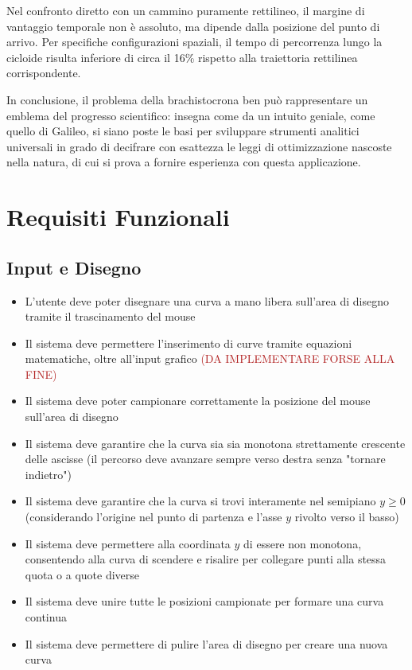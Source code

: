 \documentclass[a4paper,12pt]{article} %
\begin{document}
Nel confronto diretto con un cammino puramente rettilineo, il margine di vantaggio temporale non è assoluto, ma dipende dalla posizione del punto di arrivo. Per specifiche configurazioni spaziali, il tempo di percorrenza lungo la cicloide risulta inferiore di circa il 16\% rispetto alla traiettoria rettilinea corrispondente.
\vspace{1em}

In conclusione, il problema della brachistocrona ben può rappresentare un emblema del progresso scientifico: insegna come da un intuito geniale, come quello di Galileo, si siano poste le basi per sviluppare strumenti analitici universali in grado di decifrare con esattezza le leggi di ottimizzazione nascoste nella natura, di cui si prova a fornire esperienza con questa applicazione.

\section{Requisiti Funzionali}

\subsection{Input e Disegno}

\begin{itemize}
    \item L'utente deve poter disegnare una curva a mano libera sull'area di disegno tramite il trascinamento del mouse
    \item Il sistema deve permettere l'inserimento di curve tramite equazioni matematiche, oltre all'input grafico \textcolor{firebrick}{(DA IMPLEMENTARE FORSE ALLA FINE)}
    \item Il sistema deve poter campionare correttamente la posizione del mouse sull'area di disegno
    \item Il sistema deve garantire che la curva sia sia monotona strettamente crescente delle ascisse (il percorso deve avanzare sempre verso destra senza "tornare indietro")
    \item Il sistema deve garantire che la curva si trovi interamente nel semipiano $y \ge 0$ (considerando l'origine nel punto di partenza e l'asse $y$ rivolto verso il basso)
    \item Il sistema deve permettere alla coordinata $y$ di essere non monotona, consentendo alla curva di scendere e risalire per collegare punti alla stessa quota o a quote diverse
    \item Il sistema deve unire tutte le posizioni campionate per formare una curva continua
    \item Il sistema deve permettere di pulire l'area di disegno per creare una nuova curva
\end{itemize}
\end{document}
